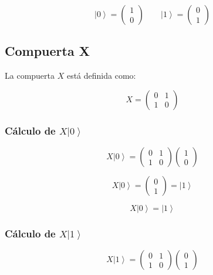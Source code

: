 \documentclass[12pt,a4paper]{article}
\newcommand{\ket}[1]{\left|#1\right\rangle}
\begin{document}
\[
\ket{0}=
\begin{pmatrix}
1\\
0
\end{pmatrix}
\qquad
\ket{1}=
\begin{pmatrix}
0\\
1
\end{pmatrix}
\]

\subsection{Compuerta X}

La compuerta \(X\) está definida como:

\[
X=
\begin{pmatrix}
0 & 1\\
1 & 0
\end{pmatrix}
\]

\subsubsection*{Cálculo de \texorpdfstring{$X\ket{0}$}{X ket 0}}

\[
X\ket{0}
=
\begin{pmatrix}
0 & 1\\
1 & 0
\end{pmatrix}
\begin{pmatrix}
1\\
0
\end{pmatrix}
\]

\[
X\ket{0}
=
\begin{pmatrix}
0\\
1
\end{pmatrix}
=
\ket{1}
\]

\begin{resultado}
\[
\boxed{X\ket{0}=\ket{1}}
\]
\end{resultado}

\subsubsection*{Cálculo de \texorpdfstring{$X\ket{1}$}{X ket 1}}

\[
X\ket{1}
=
\begin{pmatrix}
0 & 1\\
1 & 0
\end{pmatrix}
\begin{pmatrix}
0\\
1
\end{pmatrix}
\]
\end{document}
